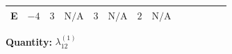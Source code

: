 \documentclass[8pt]{article}
\begin{document}
\begin{landscape}
\begin{longtable}{@{}llcccccc >{\raggedright\arraybackslash}p{0.21\linewidth} >{\raggedright\arraybackslash}p{0.21\linewidth} >{\raggedright\arraybackslash}p{0.21\linewidth}@{}}
\midrule
E & $-4$ & $3$ & $\text{N/A}$ & $3$ & $\text{N/A}$ & $2$ & $\text{N/A}$ & \scriptsize\adjustbox{max width=\linewidth}{$\begin{gathered} +{\lambda_{S_1}^{(1)}} (8 {\lambda_{12}^{(1)}}+4 {\lambda_{12}^{(\times)}})\end{gathered}$} & \scriptsize\adjustbox{max width=\linewidth}{$\begin{gathered} +{\lambda_{S_2}^{(1)}} (8 {\lambda_{12}^{(1)}}+4 {\lambda_{12}^{(\times)}})\end{gathered}$} & \scriptsize\adjustbox{max width=\linewidth}{$\begin{gathered} +{\lambda_{12}^{(1)}} (4 {\lambda_{S_1}^{(A)}}+4 {\lambda_{S_2}^{(A)}})\end{gathered}$} \\
\midrule
\bottomrule
\end{longtable}
\clearpage
\noindent\textbf{Quantity: }$\lambda_{12}^{(1)}$\par\smallskip

\end{landscape}
\end{document}
